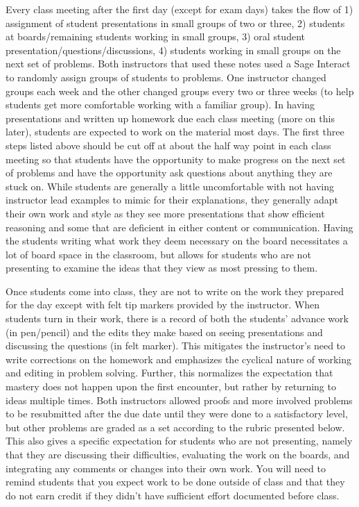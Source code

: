 \begin{annotation}
Every class meeting after the first day (except for exam days) takes the flow of 1) assignment of student presentations in small groups of two or three, 2) students at boards/remaining students working in small groups, 3) oral student presentation/questions/discussions, 4) students working in small groups on the next set of problems. Both instructors that used these notes used a Sage Interact to randomly assign groups of students to problems. One instructor changed groups each week and the other changed groups every two or three weeks (to help students get more comfortable working with a familiar group). In having presentations and written up homework due each class meeting (more on this later), students are expected to work on the material most days. The first three steps listed above should be cut off at about the half way point in each class meeting so that students have the opportunity to make progress on the next set of problems and have the opportunity ask questions about anything they are stuck on. While students are generally a little uncomfortable with not having instructor lead examples to mimic for their explanations, they generally adapt their own work and style as they see more presentations that show efficient reasoning and some that are deficient in either content or communication. Having the students writing what work they deem necessary on the board necessitates a lot of board space in the classroom, but allows for students who are not presenting to examine the ideas that they view as most pressing to them.

Once students come into class, they are not to write on the work they prepared for the day except with felt tip markers provided by the instructor. When students turn in their work, there is a record of both the students' advance work (in pen/pencil) and the edits they make based on seeing presentations and discussing the questions (in felt marker). This mitigates the instructor’s need to write corrections on the homework and emphasizes the cyclical nature of working and editing in problem solving. Further, this normalizes the expectation that mastery does not happen upon the first encounter, but rather by returning to ideas multiple times. Both instructors allowed proofs and more involved problems to be resubmitted after the due date until they were done to a satisfactory level, but other problems are graded as a set according to the rubric presented below. This also gives a specific expectation for students who are not presenting, namely that they are discussing their difficulties, evaluating the work on the boards, and integrating any comments or changes into their own work. You will need to remind students that you expect work to be done outside of class and that they do not earn credit if they didn't have sufficient effort documented before class.


\end{annotation}

